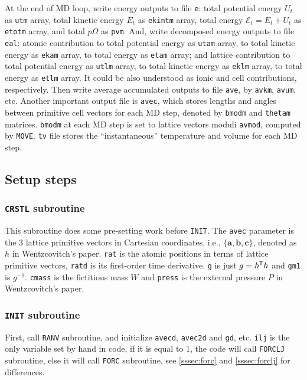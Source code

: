 At the end of MD loop, write energy outputs to file \texttt{e}: total potential energy $U_t$ as 
\texttt{utm} array, total kinetic energy $E_t$ as \texttt{ekintm} array,
total energy $\mathscr{E}_t = E_t + U_t$ as \texttt{etotm} array, and
total $p \Omega$ as \texttt{pvm}. And, write decomposed energy outputs
to file \texttt{eal}: atomic contribution to total potential energy as 
\texttt{utam} array, to total kinetic energy as \texttt{ekam} array,
to total energy as \texttt{etam} array; and lattice contribution to
total potential energy as \texttt{utlm} array, to total kinetic 
energy as \texttt{eklm} array,
to total energy as \texttt{etlm} array. It could be also understood as
ionic and cell contributions, respectively. Then write average accumulated
outputs to file \texttt{ave}, by \texttt{avkm}, \texttt{avum}, etc. Another
important output file is \texttt{avec}, which stores lengths and angles 
between primitive cell vectors for each MD step, 
denoted by \texttt{bmodm} and
\texttt{thetam} matrices. \texttt{bmodm} at each MD step
is set to lattice vectors moduli \texttt{avmod}, computed by \texttt{MOVE}.
\texttt{tv} file stores the ``instantaneous'' temperature and volume
for each MD step.


\subsection{Setup steps}

\subsubsection{\texttt{CRSTL} subroutine}

This subroutine does some pre-setting work before \texttt{INIT}.
The \texttt{avec} parameter is the $3$ lattice primitive vectors in Cartesian
coordinates,
i.e., $\{ \bm{a}, \bm{b}, \bm{c} \}$,
denoted as $h$ in Wentzcovitch's paper.\cite{Wentzcovitch:1991ka}
\texttt{rat} is the atomic positions in terms of lattice primitive vectors,
\texttt{ratd} is its first-order time derivative.
\texttt{g} is just $g = h ^{\mkern-1.5mu\mathsf{T}} h$ and \texttt{gm1} is $g^{-1}$.
\texttt{cmass} is the fictitious mass $W$ and
\texttt{press} is the external pressure $P​$ in
Wentzcovitch's paper.\cite{Wentzcovitch:1991ka}


\subsubsection{\texttt{INIT} subroutine}

First, call \texttt{RANV} subroutine, and initialize \texttt{avecd},
\texttt{avec2d} and \texttt{gd}, etc.
\texttt{ilj} is the only variable set by hand in code, if it is equal to $1$,
the code will call \texttt{FORCLJ} subroutine, else it will call \texttt{FORC}
subroutine, see \ref{sssec:forc} and \ref{sssec:forclj} for differences.

